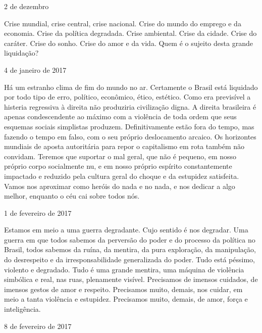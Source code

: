 \begin{flushright}
2 de dezembro
\end{flushright}

Crise mundial, crise central, crise nacional. Crise do mundo do emprego
e da economia. Crise da política degradada. Crise ambiental. Crise da
cidade. Crise do caráter. Crise do sonho. Crise do amor e da vida. Quem
é o sujeito desta grande liquidação?

\begin{flushright}
4 de janeiro de 2017
\end{flushright}

Há um estranho clima de fim do mundo no ar. Certamente o Brasil está
liquidado por todo tipo de erro, político, econômico, ético, estético.
Como era previsível a histeria regressiva à direita não produziria
civilização digna. A direita brasileira é apenas condescendente ao
máximo com a violência de toda ordem que seus esquemas sociais
simplistas produzem. Definitivamente estão fora do tempo, mas fazendo o
tempo em falso, com o seu próprio deslocamento arcaico. Os horizontes
mundiais de aposta autoritária para repor o capitalismo em rota também
não convidam. Teremos que suportar o mal geral, que não é pequeno, em
nosso próprio corpo socialmente nu, e em nosso próprio espírito
constantemente impactado e reduzido pela cultura geral do choque e da
estupidez satisfeita. Vamos nos aproximar como heróis do nada e no nada,
e nos dedicar a algo melhor, enquanto o céu cai sobre todos nós.

\begin{flushright}
1 de fevereiro de 2017
\end{flushright}

Estamos em meio a uma guerra degradante. Cujo sentido é nos degradar.
Uma guerra em que todos sabemos da perversão do poder e do processo da
política no Brasil, todos sabemos da ruína, da mentira, da pura
exploração, da manipulação, do desrespeito e da irresponsabilidade
generalizada do poder. Tudo está péssimo, violento e degradado. Tudo é
uma grande mentira, uma máquina de violência simbólica e real, nas ruas,
plenamente visível. Precisamos de imensos cuidados, de imensos gestos de
amor e respeito. Precisamos muito, demais, nos cuidar, em meio a tanta
violência e estupidez. Precisamos muito, demais, de amor, força e
inteligência.

\begin{flushright}
8 de fevereiro de 2017
\end{flushright}

